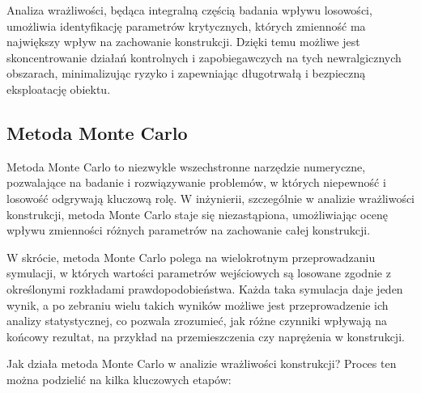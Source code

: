 Analiza wrażliwości, będąca integralną częścią badania wpływu losowości, umożliwia identyfikację parametrów krytycznych, których zmienność ma największy wpływ na zachowanie konstrukcji.
Dzięki temu możliwe jest skoncentrowanie działań kontrolnych i zapobiegawczych na tych newralgicznych obszarach, minimalizując ryzyko i zapewniając długotrwałą i bezpieczną eksploatację obiektu.

\subsection{Metoda Monte Carlo}

Metoda Monte Carlo to niezwykle wszechstronne narzędzie numeryczne, pozwalające na badanie i rozwiązywanie problemów, w których niepewność i losowość odgrywają kluczową rolę.
W inżynierii, szczególnie w analizie wrażliwości konstrukcji, metoda Monte Carlo staje się niezastąpiona, umożliwiając ocenę wpływu zmienności różnych parametrów na zachowanie całej konstrukcji.

W skrócie, metoda Monte Carlo polega na wielokrotnym przeprowadzaniu symulacji, w których wartości parametrów wejściowych są losowane zgodnie z określonymi rozkładami prawdopodobieństwa.
Każda taka symulacja daje jeden wynik, a po zebraniu wielu takich wyników możliwe jest przeprowadzenie ich analizy statystycznej, co pozwala zrozumieć, jak różne czynniki wpływają na końcowy rezultat, na przykład na przemieszczenia czy naprężenia w konstrukcji.

Jak działa metoda Monte Carlo w analizie wrażliwości konstrukcji?
Proces ten można podzielić na kilka kluczowych etapów:

